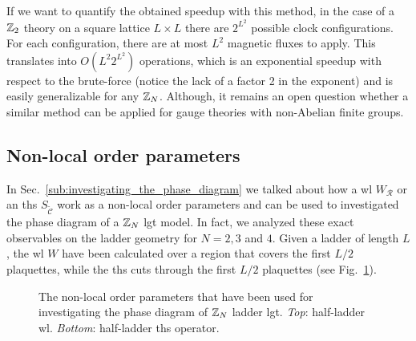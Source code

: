 If we want to quantify the obtained speedup with this method, in the case of a $\mathbb{Z}_2$ theory on a square lattice $L \times L$ there are $2^{L^2}$ possible clock configurations.
For each configuration, there are at most $L^2$ magnetic fluxes to apply.
This translates into $O(L^2 2^{L^2})$ operations, which is an exponential speedup with respect to the brute-force (notice the lack of a factor 2 in the exponent) and is easily generalizable for any $\mathbb{Z}_N$.
Although, it remains an open question whether a similar method can be applied for gauge theories with non-Abelian finite groups.



\subsection{Non-local order parameters}%
\label{sub:non_local_order_parameters}

In Sec.~\ref{sub:investigating_the_phase_diagram} we talked about how a \ac{wl} $W_{\mathcal{R}}$ or an \ac{ths} $S_{\tilde{\mathcal{C}}}$ work as a non-local order parameters and can be used to investigated the phase diagram of a $\mathbb{Z}_N$ \ac{lgt} model.
In fact, we analyzed these exact observables on the ladder geometry for $N = 2,3$ and $4$.
Given a ladder of length $L$, the \ac{wl} $W$ have been calculated over a region that covers the first $L/2$ plaquettes, while the \ac{ths} cuts through the first $L/2$ plaquettes (see Fig.~\ref{fig:nlop_ladder}).

\begin{figure}[h]
    \centering
    
    \caption[Non-local order parameters on the ladder]{The non-local order parameters that have been used for investigating the phase diagram of $\mathbb{Z}_N$ ladder \ac{lgt}.
    \emph{Top}: half-ladder \ac{wl}.
    \emph{Bottom}: half-ladder \ac{ths} operator.}%
    \label{fig:nlop_ladder}
\end{figure}
